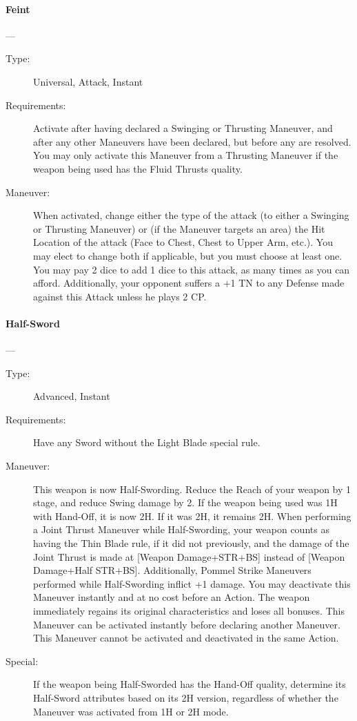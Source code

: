 \documentclass[oneside,11pt,english]{book}
\begin{document}
\paragraph{\large\label{man:Feint}Feint}---\quad{\large[2+Variable]}
\vspace{-10pt}\begin{description} 
\item [Type:] Universal, Attack, Instant 
\item [Requirements:] Activate after having declared a Swinging or Thrusting
  Maneuver, and after any other Maneuvers have been declared, but before any are
  resolved. You may only activate this Maneuver from a Thrusting Maneuver if the
  weapon being used has the Fluid Thrusts quality.  
\item [Maneuver:] When activated, change either the type of the attack (to
  either a Swinging or Thrusting Maneuver) or (if the Maneuver targets an area)
  the Hit Location of the attack (Face to Chest, Chest to Upper Arm, etc.). You
  may elect to change both if applicable, but you must choose at least one. You
  may pay 2 dice to add 1 dice to this attack, as many times as you can afford.
  Additionally, your opponent suffers a +1 TN to any Defense made against this
  Attack unless he plays 2 CP. 
\end{description}

\paragraph{\large\label{man:Half-Sword}Half-Sword}---\quad{\large[1]}
\vspace{-10pt}\begin{description} 
\item [Type:] Advanced, Instant 
\item [Requirements:] Have any Sword without the Light Blade special rule. 
\item [Maneuver:] This weapon is now Half-Swording. Reduce the Reach of your
  weapon by 1 stage, and reduce Swing damage by 2. If the weapon being used was
  1H with Hand-Off, it is now 2H. If it was 2H, it remains 2H. When performing a
  Joint Thrust Maneuver while Half-Swording, your weapon counts as having the
  Thin Blade rule, if it did not previously, and the damage of the Joint Thrust
  is made at [Weapon Damage+STR+BS] instead of [Weapon Damage+Half STR+BS].
  Additionally, Pommel Strike Maneuvers performed while Half-Swording inflict +1
  damage. You may deactivate this Maneuver instantly and at no cost before an
  Action. The weapon immediately regains its original characteristics and loses
  all bonuses. This Maneuver can be activated instantly before declaring another
  Maneuver. This Maneuver cannot be activated and deactivated in the same
  Action. 
\item [Special:] If the weapon being Half-Sworded has the Hand-Off quality, determine its Half-Sword attributes 
  based on its 2H version, regardless of whether the Maneuver was activated from 1H or 2H mode. 
\end{description}
\end{document}
